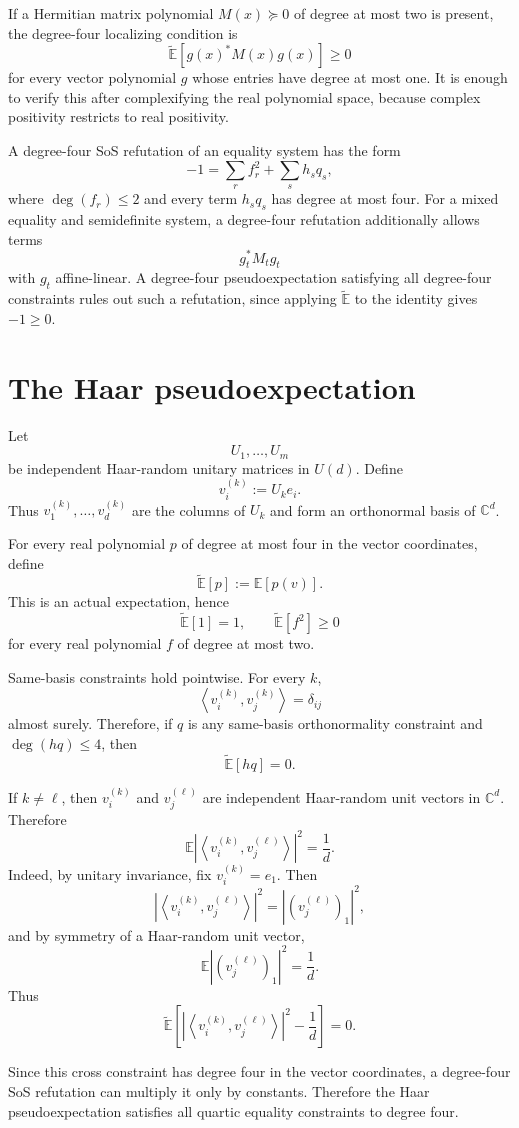 \documentclass[11pt]{article}
\theoremstyle{remark}
\newcommand{\C}{\mathbb{C}}
\newcommand{\E}{\mathbb{E}}
\newcommand{\Et}{\widetilde{\mathbb{E}}}
\newcommand{\ip}[2]{\left\langle #1,#2\right\rangle}
\begin{document}
If a Hermitian matrix polynomial $M(x)\succeq0$ of degree at most two is present, the degree-four localizing condition is
\[
\Et[g(x)^*M(x)g(x)]\ge0
\]
for every vector polynomial $g$ whose entries have degree at most one. It is enough to verify this after complexifying the real polynomial space, because complex positivity restricts to real positivity.

A degree-four SoS refutation of an equality system has the form
\[
-1=\sum_r f_r^2+\sum_s h_s q_s,
\]
where $\deg(f_r)\le2$ and every term $h_s q_s$ has degree at most four. For a mixed equality and semidefinite system, a degree-four refutation additionally allows terms
\[
g_t^*M_tg_t
\]
with $g_t$ affine-linear. A degree-four pseudoexpectation satisfying all degree-four constraints rules out such a refutation, since applying $\Et$ to the identity gives $-1\ge0$.

\section{The Haar pseudoexpectation}

Let
\[
U_1,\ldots,U_m
\]
be independent Haar-random unitary matrices in $U(d)$. Define
\[
v_i^{(k)}:=U_ke_i.
\]
Thus $v_1^{(k)},\ldots,v_d^{(k)}$ are the columns of $U_k$ and form an orthonormal basis of $\C^d$.

For every real polynomial $p$ of degree at most four in the vector coordinates, define
\[
\Et[p]:=\E[p(v)].
\]
This is an actual expectation, hence
\[
\Et[1]=1,
\qquad
\Et[f^2]\ge0
\]
for every real polynomial $f$ of degree at most two.

Same-basis constraints hold pointwise. For every $k$,
\[
\ip{v_i^{(k)}}{v_j^{(k)}}=\delta_{ij}
\]
almost surely. Therefore, if $q$ is any same-basis orthonormality constraint and $\deg(hq)\le4$, then
\[
\Et[hq]=0.
\]

If $k\ne\ell$, then $v_i^{(k)}$ and $v_j^{(\ell)}$ are independent Haar-random unit vectors in $\C^d$. Therefore
\[
\E |\ip{v_i^{(k)}}{v_j^{(\ell)}}|^2=\frac1d.
\]
Indeed, by unitary invariance, fix $v_i^{(k)}=e_1$. Then
\[
|\ip{v_i^{(k)}}{v_j^{(\ell)}}|^2=|(v_j^{(\ell)})_1|^2,
\]
and by symmetry of a Haar-random unit vector,
\[
\E |(v_j^{(\ell)})_1|^2=\frac1d.
\]
Thus
\[
\Et\left[
|\ip{v_i^{(k)}}{v_j^{(\ell)}}|^2-\frac1d
\right]=0.
\]

Since this cross constraint has degree four in the vector coordinates, a degree-four SoS refutation can multiply it only by constants. Therefore the Haar pseudoexpectation satisfies all quartic equality constraints to degree four.
\end{document}
